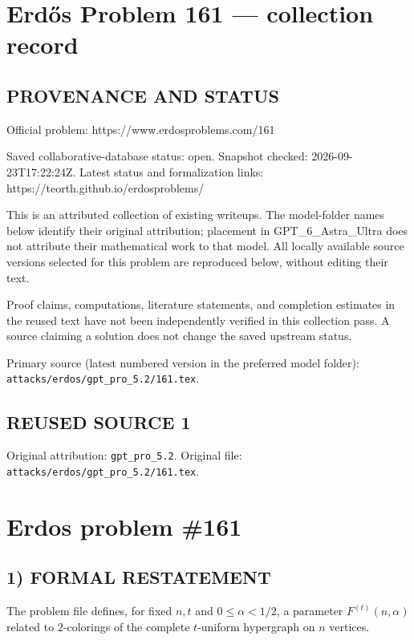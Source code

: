 \section*{Erd\H{o}s Problem 161 --- collection record}

\subsection*{PROVENANCE AND STATUS}
Official problem: https://www.erdosproblems.com/161

Saved collaborative-database status: open.
Snapshot checked: 2026-09-23T17:22:24Z.
Latest status and formalization links: https://teorth.github.io/erdosproblems/

This is an attributed collection of existing writeups. The model-folder names below identify their original attribution; placement in GPT\_6\_Astra\_Ultra does not attribute their mathematical work to that model. All locally available source versions selected for this problem are reproduced below, without editing their text.

Proof claims, computations, literature statements, and completion estimates in the reused text have not been independently verified in this collection pass. A source claiming a solution does not change the saved upstream status.

Primary source (latest numbered version in the preferred model folder): \texttt{attacks/erdos/gpt\_pro\_5.2/161.tex}.

\subsection*{REUSED SOURCE 1}
Original attribution: \texttt{gpt\_pro\_5.2}.
Original file: \texttt{attacks/erdos/gpt\_pro\_5.2/161.tex}.

\section*{Erdos problem \#161}

\subsection*{1) FORMAL RESTATEMENT}
The problem file defines, for fixed $n,t$ and $0\le \alpha<1/2$, a parameter $F^{(t)}(n,\alpha)$ related to $2$-colorings of the complete $t$-uniform hypergraph on $n$ vertices.

